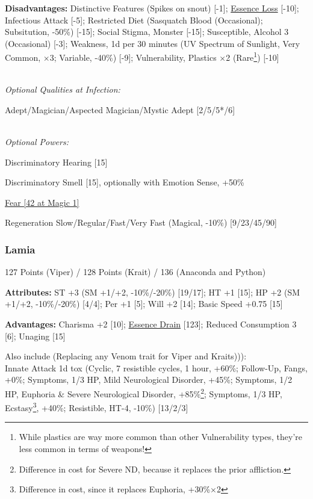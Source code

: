 \begin{multicols*}{3}
	\textbf{Disadvantages:}	
	Distinctive Features (Spikes on snout) [-1]; \hyperref[essence_loss]{Essence Loss} [-10]; Infectious Attack [-5]; Restricted Diet (Sasquatch Blood (Occasional); Subsitution, -50\%) [-15]; Social Stigma, Monster [-15]; Susceptible, Alcohol 3 (Occasional) [-3]; Weakness, 1d per 30 minutes (UV Spectrum of Sunlight, Very Common, $\times$3; Variable, -40\%) [-9]; Vulnerability, Plastics $\times$2 (Rare\footnote{While plastics are way more common than other Vulnerability types, they're less common in terms of weapons!}) [-10]
	
	\textit{\\Optional Qualities at Infection:}
	
	Adept/Magician/Aspected Magician/Mystic Adept [2/5/5*/6]
	
	\textit{\\Optional Powers:}
	
	
	Discriminatory Hearing [15]
	
	Discriminatory Smell [15], optionally with Emotion Sense, +50\%
	
	\hyperref[fear]{Fear [42 at Magic 1]}
	
	Regeneration Slow/Regular/Fast/Very Fast (Magical, -10\%) [9/23/45/90]
		
	\subsubsection{Lamia}\label{lamia}
	\begin{flushright}
		127 Points (Viper) / 128 Points (Krait) / 136 (Anaconda and Python)
	\end{flushright}

	\textbf{Attributes:}
	ST +3 (SM +1/+2, -10\%/-20\%) [19/17]; HT +1 [15]; HP +2 (SM +1/+2, -10\%/-20\%) [4/4]; Per +1 [5]; Will +2 [14]; Basic Speed +0.75 [15]
	
	\textbf{Advantages:}
	Charisma +2 [10]; \hyperref[essence_drain]{Essence Drain} [123]; Reduced Consumption 3 [6]; Unaging [15]
	
	Also include (Replacing any Venom trait for Viper and Kraits))):\\
	Innate Attack 1d tox (Cyclic, 7 resistible cycles, 1 hour, +60\%; Follow-Up, Fangs, +0\%; Symptoms, 1/3 HP, Mild Neurological Disorder, +45\%; Symptoms, 1/2 HP, Euphoria \& Severe Neurological Disorder, +85\%\footnote{Difference in cost for Severe ND, because it replaces the prior affliction.}; Symptoms, 1/3 HP, Ecstasy\footnote{Difference in cost, since it replaces Euphoria, +30\%$\times$2}, +40\%; Resistible, HT-4, -10\%) [13/2/3]
	

\end{multicols*}
